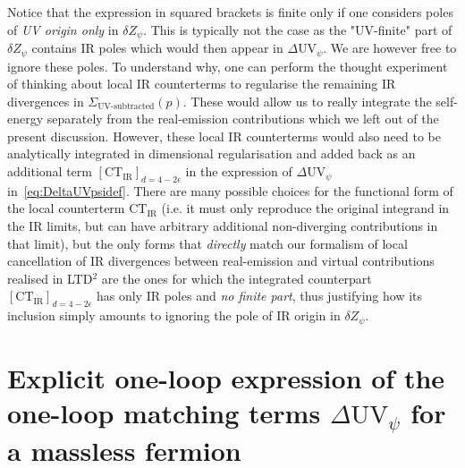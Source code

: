\documentclass[11pt]{article}
\begin{document}
Notice that the expression in squared brackets is finite only if one considers poles of \emph{UV origin only} in $\delta Z_\psi$. This is typically not the case as the "UV-finite" part of $\delta Z_\psi$ contains IR poles which would then appear in $ \Delta \textrm{UV}_\psi $.
We are however free to ignore these poles.
To understand why, one can perform the thought experiment of thinking about local IR counterterms to regularise the remaining IR divergences in $\Sigma_{\textrm{UV-subtracted}}(p)$.
These would allow us to really integrate the self-energy separately from the real-emission contributions which we left out of the present discussion.
However, these local IR counterterms would also need to be analytically integrated in dimensional regularisation and added back as an additional term $\left [ \textrm{CT}_{\textrm{IR}} \right ]_{d=4-2\epsilon}$ in the expression of $ \Delta \textrm{UV}_\psi $ in~\eqref{eq:DeltaUVpsidef}.
There are many possible choices for the functional form of the local counterterm $\textrm{CT}_{\textrm{IR}}$ (i.e. it must only reproduce the original integrand in the IR limits, but can have arbitrary additional non-diverging contributions in that limit), but the only forms that \emph{directly} match our formalism of local cancellation of IR divergences between real-emission and virtual contributions realised in LTD$^2$ are the ones for which the integrated counterpart $\left [ \textrm{CT}_{\textrm{IR}} \right ]_{d=4-2\epsilon}$ has only IR poles and \emph{no finite part}, thus justifying how its inclusion simply amounts to ignoring the pole of IR origin in $\delta Z_\psi$.

\section{Explicit one-loop expression of the one-loop matching terms $\Delta \textrm{UV}_{\psi}$ for a massless fermion}
\label{sec::explicitDeltaUV}
\end{document}
